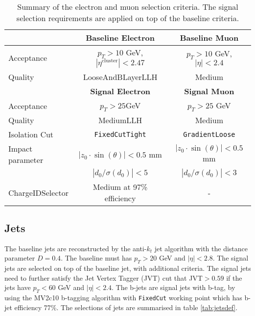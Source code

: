 \begin{table}[htbp]
\begin{center}
\begin{tabular}{|l|c|c|}
\hline
& \textbf{Baseline Electron} & \textbf{Baseline Muon} \\
\hline
\hline
Acceptance     & $p_T > 10$ GeV, $|\eta^{\text{cluster}}| < 2.47$  & $p_T > 10$ GeV, $|\eta| < 2.4$ \\
\hline
Quality & LooseAndBLayerLLH & Medium \\
\hline
\hline
& \textbf{Signal Electron} & \textbf{Signal Muon} \\
\hline
\hline
Acceptance & $p_T > 25$GeV & $p_T > 25$ GeV \\
\hline
Quality & MediumLLH & Medium \\
\hline
Isolation Cut  & \texttt{FixedCutTight} & \texttt{GradientLoose} \\
\hline
Impact parameter & $|z_0 \cdot \sin (\theta)|< 0.5$ mm   & $|z_0 \cdot \sin (\theta)|< 0.5$ mm \\
& $|d_0/\sigma(d_0)|<5$ & $|d_0/\sigma(d_0)| < 3$\\
\hline
ChargeIDSelector & Medium at 97\% efficiency & - \\
\hline
\end{tabular}
\end{center}
\caption{Summary of the electron and muon selection criteria. The signal selection requirements are applied on top of the baseline criteria.}
\label{tab:lepdef}
\end{table}

\subsection{Jets}
The baseline jets are reconstructed by the anti-$k_t$ jet algorithm with the distance parameter $D = 0.4$.
The baseline must has $p_T > 20$ GeV and $|\eta| < 2.8$.
The signal jets are selected on top of the baseline jet, with additional criteria.
The signal jets need to further satisfy the Jet Vertex Tagger (JVT) cut that JVT$> 0.59$ if the jets have $p_T < 60$ GeV and $|\eta| < 2.4$.
The b-jets are signal jets with b-tag, by using the MV2c10 b-tagging algorithm with \texttt{FixedCut} working point which has b-jet efficiency 77\%.
The selections of jets are summarised in table \ref{tab:jetsdef}.

